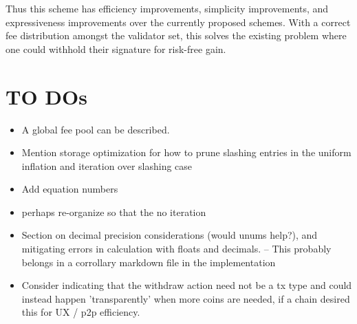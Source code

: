 \documentclass[]{article}
\begin{document}
Thus this scheme has efficiency improvements, simplicity improvements, and expressiveness improvements over the currently proposed schemes. With a correct fee distribution amongst the validator set, this solves the existing problem where one could withhold their signature for risk-free gain.

\section{TO DOs}

\begin{itemize}
	\item A global fee pool can be described.
	\item Mention storage optimization for how to prune slashing entries in the uniform inflation and iteration over slashing case
	\item Add equation numbers
	\item perhaps re-organize so that the no iteration
 	\item Section on decimal precision considerations (would unums help?), and mitigating errors in calculation with floats and decimals. -- This probably belongs in a corrollary markdown file in the implementation
 	\item Consider indicating that the withdraw action need not be a tx type and could instead happen 'transparently' when more coins are needed, if a chain desired this for UX / p2p efficiency.
\end{itemize}
\end{document}
